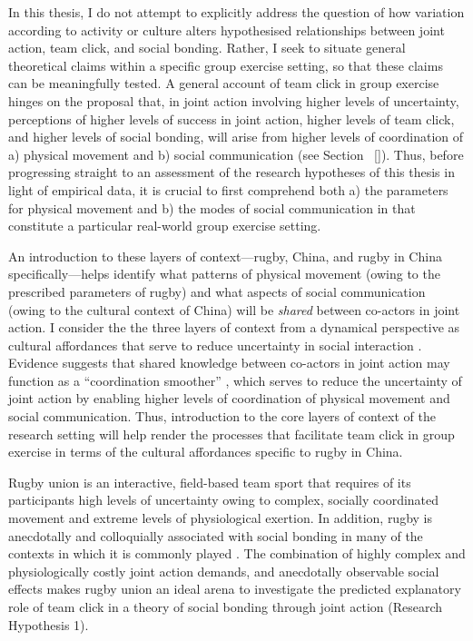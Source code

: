 \begin{CJK}{UTF8}{gbsn}
In this thesis, I do not attempt to explicitly address the question of how variation according to activity or culture alters hypothesised relationships between joint action, team click, and social bonding.  Rather, I seek to situate general theoretical claims within a specific group exercise setting, so that these claims can be meaningfully tested.  A general account of team click in group exercise hinges on the proposal that, in joint action involving higher levels of uncertainty, perceptions of higher levels of success in joint action, higher levels of team click, and higher levels of social bonding, will arise from higher levels of coordination of a) physical movement and b) social communication (see Section ~\ref{}). Thus, before progressing straight to an assessment of the research hypotheses of this thesis in light of empirical data,  it is crucial to first comprehend both a) the parameters for physical movement and b) the modes of social communication in that constitute a particular real-world group exercise setting.

An introduction to these layers of context---rugby, China, and rugby in China specifically---helps identify what patterns of physical movement (owing to the prescribed parameters of rugby) and what aspects of social communication (owing to the cultural context of China) will be \textit{shared} between co-actors in joint action.  I consider the the three layers of context from a dynamical perspective as cultural affordances that serve to reduce uncertainty in social interaction \citep{Ramstead2016}.  Evidence suggests that shared knowledge between co-actors in joint action may function as a  ``coordination smoother'' \citep{Vesper2017}, which serves to reduce the uncertainty of joint action by enabling higher levels of coordination of physical movement and social communication.  Thus, introduction to the core layers of context of the research setting will help render the processes that facilitate team click in group exercise in terms of the cultural affordances specific to rugby in China.

Rugby union is an interactive, field-based team sport that requires of its participants high levels of uncertainty owing to complex, socially coordinated movement and extreme levels of physiological exertion.  In addition, rugby is anecdotally and colloquially associated with social bonding in many of the contexts in which it is commonly played \citep{Dunning2005}.  The combination of highly complex and physiologically costly joint action demands, and anecdotally observable social effects makes rugby union an ideal arena to investigate the predicted explanatory role of team click in a theory of social bonding through joint action (Research Hypothesis 1).


\end{CJK}
